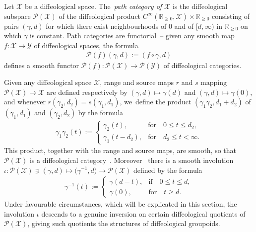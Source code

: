 \documentclass[10pt,a4paper]{amsart}
\numberwithin{equation}{section}
\def\PP{{\mathcal{P}}}
\def\YY{{\mathcal{Y}}}
\def\XX{{\mathcal{X}}}
\def\RB{{\mathbb{R}}}
\begin{document}
\begin{Definition}%
Let $\XX$ be a diffeological space. The~\textit{path category of $\XX$} is the diffeological sub\-space $\PP(\XX)$ of the diffeological product $C^{\infty}(\RB_{\geq0},\XX)\times\RB_{\geq0}$ consisting of pairs $(\gamma,d)$ for which there exist neighbourhoods of $0$ and of $[d,\infty)$ in $\RB_{\geq0}$ on which $\gamma$ is constant. Path categories are functorial~-- given any smooth map $f\colon \XX\rightarrow \YY$ of diffeological spaces, the formula
\begin{gather*}
\PP(f)(\gamma,d):=(f\circ\gamma,d)
\end{gather*}
defines a smooth functor $\PP(f)\colon \PP(\XX)\rightarrow \PP(\YY)$ of diffeological categories.
\end{Definition}

Given any diffeological space $\XX$, range and source maps $r$ and $s$ mapping $\PP(\XX)\rightarrow \XX$ are defined respectively by $(\gamma,d)\mapsto \gamma(d)$ and $(\gamma,d)\mapsto\gamma(0)$, and whenever $r(\gamma_{2},d_{2}) = s(\gamma_{1},d_{1})$, we~define the product $(\gamma_{1}\gamma_{2},d_{1}+d_{2})$ of $(\gamma_{1},d_{1})$ and $(\gamma_{2},d_{2})$ by the formula
\begin{gather*}
\gamma_{1}\gamma_{2}(t):=
\begin{cases}
\gamma_{2}(t),&\text{for}\quad 0\leq t\leq d_{2},
\\
\gamma_{1}(t-d_{2}),&\text{for}\quad d_{2}\leq t<\infty.
\end{cases}
\end{gather*}
This product, together with the range and source maps, are smooth, so that $\PP(\XX)$ is a dif\-feo\-lo\-gi\-cal category~\cite[Proposition~3.22]{mac3}. Moreover~\cite[Proposition~3.23]{mac3} there is a smooth involution $\iota\colon \PP(\XX)\ni(\gamma,d)\mapsto\big(\gamma^{-1},d\big)\rightarrow\PP(\XX)$ defined by the formula
\begin{gather*}
\gamma^{-1}(t):=
\begin{cases}
\gamma(d-t),&\text{if}\quad 0\leq t\leq d,
\\
\gamma(0),&\text{for}\quad t\geq d.
\end{cases}
\end{gather*}
Under favourable circumstances, which will be explicated in this section, the involution $\iota$ des\-cends to a genuine inversion on certain diffeological quotients of $\PP(\XX)$, giving such quotients the structures of diffeological groupoids.
\end{document}
